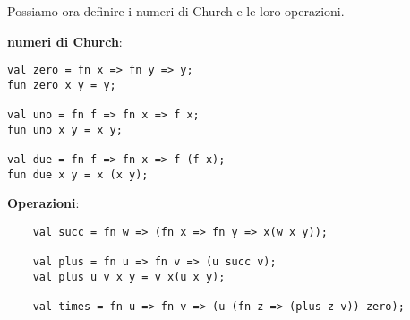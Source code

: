 \documentclass[a4paper,11pt]{report}
\begin{document}
Possiamo ora definire i numeri di Church e le loro operazioni.

\textbf{numeri di Church}:
\begin{lstlisting}
val zero = fn x => fn y => y;
fun zero x y = y;

val uno = fn f => fn x => f x;
fun uno x y = x y;

val due = fn f => fn x => f (f x);
fun due x y = x (x y);
\end{lstlisting}

\textbf{Operazioni}:
\begin{lstlisting}
    val succ = fn w => (fn x => fn y => x(w x y));

    val plus = fn u => fn v => (u succ v);
    val plus u v x y = v x(u x y);

    val times = fn u => fn v => (u (fn z => (plus z v)) zero);
\end{lstlisting}
\end{document}
